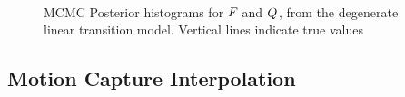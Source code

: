 \documentclass[journal,10pt]{IEEEtran}
\begin{document}
\begin{figure}
 \centering
  \\
 \caption{MCMC Posterior histograms for \protect{} $F_{}$ and \protect{} $Q_{}$, from the degenerate linear transition model. Vertical lines indicate true values}
 \label{fig:toy-FQ-hist}
\end{figure}



\subsection{Motion Capture Interpolation} \label{sec:mocap}
\end{document}
